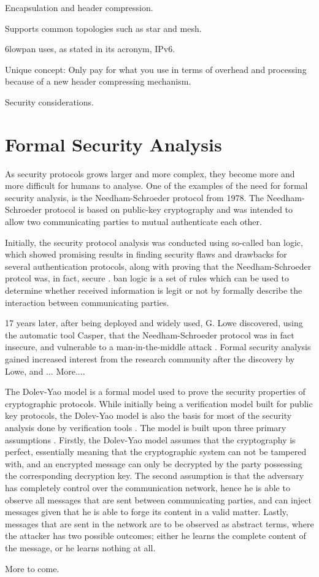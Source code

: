 Encapsulation and header compression. 

Supports common topologies such as star and mesh.

\gls{6lowpan} uses, as stated in its acronym, IPv6.

Unique concept: Only pay for what you use in terms of overhead and processing because of a new header compressing mechanism.



Security considerations.



\section{Formal Security Analysis} 


As security protocols grows larger and more complex, they become more and more difficult for humans to analyse. One of the examples of the need for formal security analysis, is the Needham-Schroeder protocol \cite{Needham:1978} from 1978. The Needham-Schroeder protocol is based on public-key cryptography and was intended to allow two communicating parties to mutual authenticate each other.

Initially, the security protocol analysis was conducted using so-called \gls{ban} logic, which showed promising results in finding security flaws and drawbacks for several authentication protocols, along with proving that the Needham-Schroeder protcol was, in fact, secure \cite{burrows1989logic}. \gls{ban} logic is a set of rules which can be used to determine whether received information is legit or not by formally describe the interaction between communicating parties. 

17 years later, after being deployed and widely used, G. Lowe discovered, using the automatic tool Casper, that the Needham-Schroeder protocol was in fact insecure, and vulnerable to a man-in-the-middle attack \cite{lowe1996}. Formal security analysis gained increased interest from the research community after the discovery by Lowe, and ... More....

The Dolev-Yao model is a formal model used to prove the security properties of cryptographic protocols. While initially being a verification model built for public key protocols, the Dolev-Yao model is also the basis for most of the security analysis done by verification tools \cite{cremers2005operational}. The model is built upon three primary assumptions \cite{dolev1983security}. Firstly, the Dolev-Yao model assumes that the cryptography is perfect, essentially meaning that the cryptographic system can not be tampered with, and an encrypted message can only be decrypted by the party possessing the corresponding decryption key. The second assumption is that the adversary has completely control over the communication network, hence he is able to observe all messages that are sent between communicating parties, and can inject messages given that he is able to forge its content in a valid matter. Lastly, messages that are sent in the network are to be observed as abstract terms, where the attacker has two possible outcomes; either he learns the complete content of the message, or he learns nothing at all. 

More to come.


